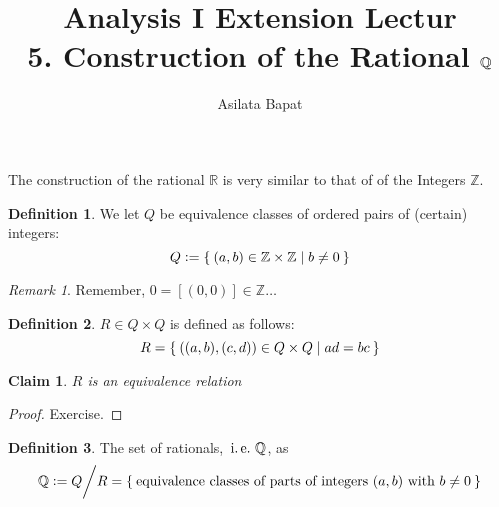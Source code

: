 \documentclass[12pt]{amsart}
\title[Construction of the Rational $\bbQ$]
	{Analysis I Extension Lectur\\5. Construction of the Rational $\bbQ$}
\author{Asilata Bapat}
\newcommand{\bbR}{\mathbb{R}}
\newcommand{\bbZ}{\mathbb{Z}}
\newcommand{\bbQ}{\mathbb{Q}}
\newcommand{\ie}{\operatorname{\thinspace i.e. \thinspace}}
\theoremstyle{plain}
\newtheorem*{claim}{Claim}
\theoremstyle{remark}
\newtheorem*{rmk}{Remark}
\theoremstyle{definition}
\newtheorem*{define}{Definition}
\begin{document}
\maketitle
{}

The construction of the rational $\bbR$ is very similar to that of of the Integers $\bbZ$.
\begin{define}
	We let $Q$ be equivalence classes of ordered pairs of (certain) integers:
	\begin{equation*}
		Q \vcentcolon = \Set{(a,b) \in \bbZ \times \bbZ | b \neq 0}
	\end{equation*}
\end{define}

\begin{rmk}
	Remember, $0 = [(0,0)] \in \bbZ\dots$
\end{rmk}

\begin{define}
	$R\in Q \times Q$ is defined as follows:
	\begin{equation*}
		R = \Set{((a,b), (c,d)) \in Q \times Q | ad = bc}
	\end{equation*}
\end{define}
\begin{claim}
	$R$ is an equivalence relation
\end{claim}
\begin{proof}
	Exercise.
\end{proof}

\begin{define}
	The set of rationals, $\ie \bbQ$, as 
	\begin{equation*}
		\bbQ \vcentcolon = Q\bigg/ R= \Set{\mbox{equivalence classes of parts of integers } (a,b) \mbox{ with } b \neq 0}
	\end{equation*}
\end{define}
\end{document}

